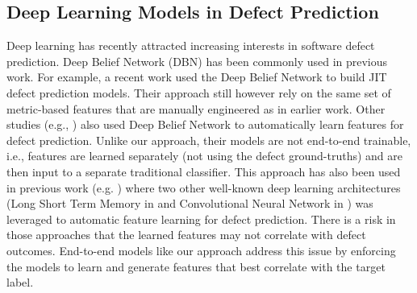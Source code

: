 

\subsection{Deep Learning Models in Defect Prediction}

Deep learning has recently attracted increasing interests in software defect prediction. Deep Belief Network (DBN) \cite{DBN-Hinton06} has been commonly used in previous work. For example,  a recent work \cite{Yang:2015:DLJ}  used the Deep Belief Network to build JIT defect prediction models. Their approach still however rely on the same set of metric-based features that are manually engineered as in earlier work. Other studies (e.g., \cite{Yang:2015:DLJ,Wang:2016:ALS,WangTSE2018}) also used Deep Belief Network to automatically learn features for defect prediction. Unlike our approach, their models are not end-to-end trainable, i.e., features are learned separately (not using the defect ground-truths) and are then input to a separate traditional classifier. This approach has also been used in previous work (e.g. \cite{Li2017,HoaTSE2019}) where two other well-known deep learning architectures (Long Short Term Memory in \cite{HoaTSE2019}  and Convolutional Neural Network in \cite{Li2017}) was leveraged to automatic feature learning for defect prediction. There is a risk in those approaches that the learned features may not correlate with defect outcomes. End-to-end models like our approach address this issue by enforcing the models to learn and generate features that best correlate with the target label.





